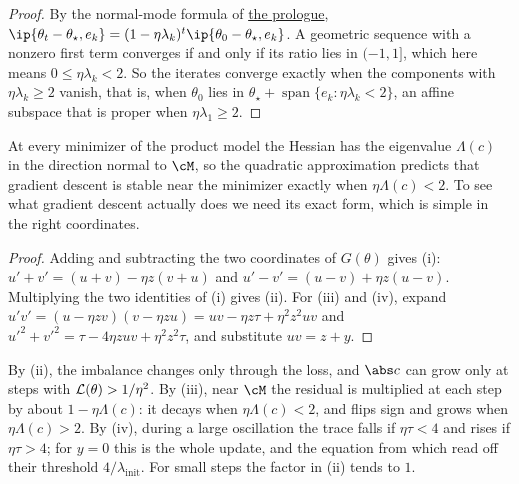 \begin{refsection}
\begin{proof}
By the normal-mode formula of \hyperref[ch:prologue]{the prologue}, $\ip{\theta_t-\theta_\star,e_k}=(1-\eta\lambda_k)^t\ip{\theta_0-\theta_\star,e_k}$. A geometric sequence with a nonzero first term converges if and only if its ratio lies in $(-1,1]$, which here means $0\le\eta\lambda_k<2$. So the iterates converge exactly when the components with $\eta\lambda_k\ge2$ vanish, that is, when $\theta_0$ lies in $\theta_\star+\operatorname{span}\{e_k\colon\eta\lambda_k<2\}$, an affine subspace that is proper when $\eta\lambda_1\ge2$.
\end{proof}

At every minimizer of the product model the Hessian has the eigenvalue $\Lambda(c)$ in the direction normal to $\cM$, so the quadratic approximation predicts that gradient descent is stable near the minimizer exactly when $\eta\Lambda(c)<2$. To see what gradient descent actually does we need its exact form, which is simple in the right coordinates.


\begin{proof}
Adding and subtracting the two coordinates of $G(\theta)$ gives (i): $u'+v'=(u+v)-\eta z(v+u)$ and $u'-v'=(u-v)+\eta z(u-v)$. Multiplying the two identities of (i) gives (ii). For (iii) and (iv), expand $u'v'=(u-\eta zv)(v-\eta zu)=uv-\eta z\tau+\eta^2z^2uv$ and $u'^2+v'^2=\tau-4\eta zuv+\eta^2z^2\tau$, and substitute $uv=z+y$.
\end{proof}

By (ii), the imbalance changes only through the loss, and $\abs c$ can grow only at steps with $\mathcal{L}(\theta)>1/\eta^2$. By (iii), near $\cM$ the residual is multiplied at each step by about $1-\eta\Lambda(c)$: it decays when $\eta\Lambda(c)<2$, and flips sign and grows when $\eta\Lambda(c)>2$. By (iv), during a large oscillation the trace falls if $\eta\tau<4$ and rises if $\eta\tau>4$; for $y=0$ this is the whole update, and the equation from which \textcite{LewkowyczEtAl2020} read off their threshold $4/\lambda_{\mathrm{init}}$. For small steps the factor in (ii) tends to $1$.


\end{refsection}
